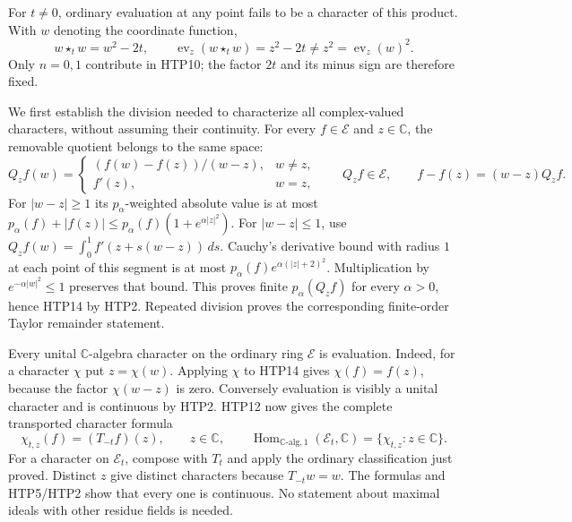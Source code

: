 For $t\ne0$, ordinary evaluation at any point fails to be a
character of this product. With $w$ denoting the coordinate
function,
\begin{equation}\tag{HTP13}
             w\star_tw=w^2-2t,
 \qquad \operatorname{ev}_z(w\star_tw)=z^2-2t
                          \ne z^2=\operatorname{ev}_z(w)^2.
\end{equation}
Only $n=0,1$ contribute in HTP10; the factor $2t$ and its
minus sign are therefore fixed.

We first establish the division needed to characterize all
complex-valued characters, without assuming their continuity.
For every $f\in\mathcal E$ and $z\in\mathbb C$, the removable
quotient belongs to the same space:
\begin{equation}\tag{HTP14}
 Q_zf(w)=\begin{cases}
       (f(w)-f(z))/(w-z),&w\ne z,\\ f'(z),&w=z,
       \end{cases}
 \qquad Q_zf\in\mathcal E,
 \qquad f-f(z)=(w-z)Q_zf.
\end{equation}
For $|w-z|\ge1$ its $p_\alpha$-weighted absolute value is at
most $p_\alpha(f)+|f(z)|\le
p_\alpha(f)(1+e^{\alpha|z|^2})$.
For $|w-z|\le1$, use
$Q_zf(w)=\int_0^1f'(z+s(w-z))\,ds$. Cauchy's derivative
bound with radius $1$ at each point of this segment is at
most $p_\alpha(f)e^{\alpha(|z|+2)^2}$.
Multiplication by $e^{-\alpha|w|^2}\le1$ preserves that
bound. This proves finite $p_\alpha(Q_zf)$ for every
$\alpha>0$, hence HTP14 by HTP2. Repeated division proves
the corresponding finite-order Taylor remainder statement.

Every unital $\mathbb C$-algebra character on the ordinary
ring $\mathcal E$ is evaluation. Indeed, for a character
$\chi$ put $z=\chi(w)$. Applying $\chi$ to HTP14 gives
$\chi(f)=f(z)$, because the factor $\chi(w-z)$ is zero.
Conversely evaluation is visibly a unital character and is
continuous by HTP2. HTP12 now gives the complete transported
character formula
\begin{equation}\tag{HTP15}
 \chi_{t,z}(f)=(T_{-t}f)(z),\qquad z\in\mathbb C,
 \qquad
 \operatorname{Hom}_{\mathbb C\text{-alg},1}(\mathcal E_t,\mathbb C)
                  =\{\chi_{t,z}:z\in\mathbb C\}.
\end{equation}
For a character on $\mathcal E_t$, compose with $T_t$ and
apply the ordinary classification just proved. Distinct $z$
give distinct characters because $T_{-t}w=w$. The formulas
and HTP5/HTP2 show that every one is continuous. No statement
about maximal ideals with other residue fields is needed.

